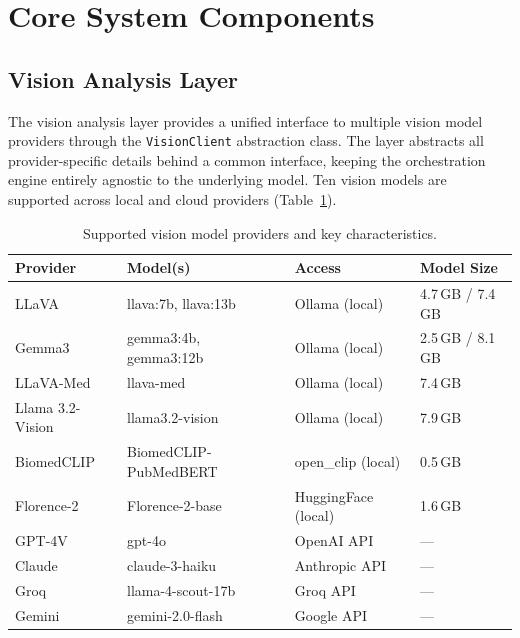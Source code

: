 \documentclass[12pt,a4paper]{report}
\begin{document}
	
	
	\section{Core System Components}
	\label{sec:components}
	
	\subsection{Vision Analysis Layer}
	\label{sec:vision}
	
	The vision analysis layer provides a unified interface to multiple vision model providers
	through the \texttt{VisionClient} abstraction class. The layer abstracts all
	provider-specific details behind a common interface, keeping the orchestration engine
	entirely agnostic to the underlying model. Ten vision models are supported across local and
	cloud providers (Table~\ref{tab:vision_providers}).
	
	
	
	
	\begin{table}[h]
		\centering
		\caption{Supported vision model providers and key characteristics.}
		\label{tab:vision_providers}
		\begin{tabular}{llll}
			\toprule
			\textbf{Provider} & \textbf{Model(s)} & \textbf{Access} & \textbf{Model Size} \\
			\midrule
			LLaVA           & llava:7b, llava:13b          & Ollama (local)     & 4.7\,GB / 7.4\,GB \\
			Gemma3          & gemma3:4b, gemma3:12b        & Ollama (local)     & 2.5\,GB / 8.1\,GB \\
			LLaVA-Med       & llava-med                    & Ollama (local)     & 7.4\,GB \\
			Llama 3.2-Vision& llama3.2-vision              & Ollama (local)     & 7.9\,GB \\
			BiomedCLIP      & BiomedCLIP-PubMedBERT        & open\_clip (local) & 0.5\,GB \\
			Florence-2      & Florence-2-base              & HuggingFace (local)& 1.6\,GB \\
			GPT-4V          & gpt-4o                       & OpenAI API         & --- \\
			Claude          & claude-3-haiku            & Anthropic API      & --- \\
			Groq            & llama-4-scout-17b            & Groq API           & --- \\
			Gemini          & gemini-2.0-flash             & Google API         & --- \\
			\bottomrule
		\end{tabular}
	\end{table}
	
\end{document}

